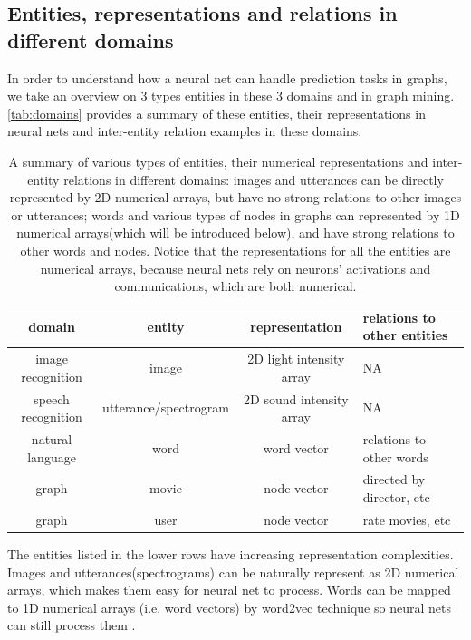 \documentclass{article}
\begin{document}
\subsection{Entities, representations and relations in different domains}
In order to understand how a neural net can handle prediction tasks in graphs, 
we take an overview on 3 types entities in these 3 domains and in graph mining. 
\autoref{tab:domains} provides a summary of these entities, their 
representations in neural nets and inter-entity relation examples in these 
domains.
\begin{table}[h]
	\centering
	\begin{tabularx}{\textwidth}{ |c|c|c|X| }
		\hline domain & entity & representation & relations to other entities 
		\\ 
		\hline image recognition & image & 2D light intensity array & NA \\ 
		\hline speech recognition & utterance/spectrogram & 2D sound intensity 
		array & NA \\ 
		\hline natural language & word & word vector & relations to other words 
		\\ 
		\hline graph & movie & node vector & directed by director, etc \\ 
		\hline graph & user & node vector & rate movies, etc \\
		\hline
	\end{tabularx}
	\caption{A summary of various types of entities, their numerical 
	representations and inter-entity relations in different domains: images and 
	utterances can be directly represented by 2D numerical arrays, but have no 
	strong relations to other images or utterances; words and various types of 
	nodes in graphs can represented by 1D numerical arrays(which will be 
	introduced below), and have strong relations to other words and nodes. 
	Notice that the representations for all the entities are numerical arrays, 
	because neural nets rely on neurons' activations and communications, which 
	are both numerical.}
	\label{tab:domains}
\end{table}
The entities listed in the lower rows have increasing 
representation complexities.
Images and utterances(spectrograms) can be naturally represent as 2D numerical 
arrays, which makes them easy for neural net to process.
Words can be mapped to 1D numerical arrays (i.e. word vectors) by word2vec 
technique so neural nets can still process them \cite{mikolov2013efficient}.
\end{document}

